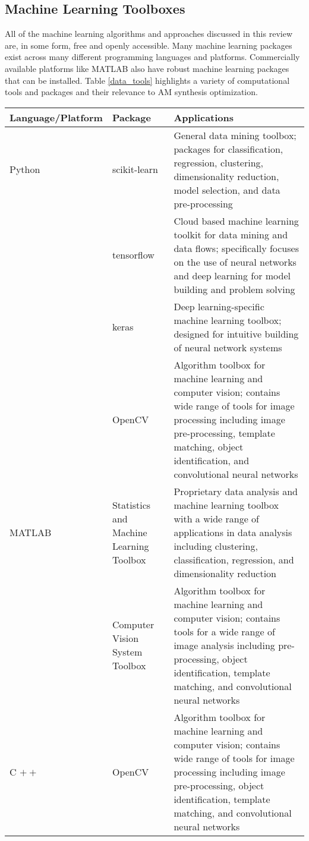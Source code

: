 \subsection{Machine Learning Toolboxes}
All of the machine learning algorithms and approaches discussed in this review are, in some form, free and openly accessible. Many machine learning packages exist across many different programming languages and platforms. Commercially available platforms like MATLAB also have robust machine learning packages that can be installed. Table \ref{data_tools} highlights a variety of computational tools and packages and their relevance to AM synthesis optimization. 

\begin{table*}
    \renewcommand{\arraystretch}{0.8}
    \setlength{\tabcolsep}{5pt}
    \begin{center}
        \begin{tabular}{p{3cm}|p{3.5cm}|p{11cm}}
            \toprule
            Language/Platform & Package & Applications  \\ \midrule 
            \hline
            \hline
            Python & scikit-learn & General data mining toolbox; packages for classification, regression, clustering, dimensionality reduction, model selection, and data pre-processing\\
            		& tensorflow & Cloud based machine learning toolkit for data mining and data flows; specifically focuses on the use of neural networks and deep learning for model building and problem solving\\
			& keras & Deep learning-specific machine learning toolbox; designed for intuitive building of neural network systems\\
			& OpenCV & Algorithm toolbox for machine learning and computer vision; contains wide range of tools for image processing including image pre-processing, template matching, object identification, and convolutional neural networks\\
			
	   MATLAB & Statistics and Machine Learning Toolbox & Proprietary data analysis and machine learning toolbox with a wide range of applications in data analysis including clustering, classification, regression, and dimensionality reduction\\
	   		& Computer Vision System Toolbox & Algorithm toolbox for machine learning and computer vision; contains tools for a wide range of image analysis including pre-processing, object identification, template matching, and convolutional neural networks\\
			
	  C $++$ & OpenCV & Algorithm toolbox for machine learning and computer vision; contains wide range of tools for image processing including image pre-processing, object identification, template matching, and convolutional neural networks\\
            \hline
            \bottomrule
        \end{tabular}
        \caption{ }
        \label{data_tools}
    \end{center}
\end{table*}

